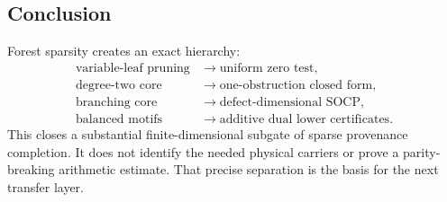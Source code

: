 \subsection*{Conclusion}

Forest sparsity creates an exact hierarchy:
\[
\begin{split}
\text{variable-leaf pruning}
&\longrightarrow \text{uniform zero test},\\
\text{degree-two core}
&\longrightarrow \text{one-obstruction closed form},\\
\text{branching core}
&\longrightarrow \text{defect-dimensional SOCP},\\
\text{balanced motifs}
&\longrightarrow \text{additive dual lower certificates}.
\end{split}
\]
This closes a substantial finite-dimensional subgate of sparse
provenance completion.  It does not identify the needed physical
carriers or prove a parity-breaking arithmetic estimate.  That precise
separation is the basis for the next transfer layer.

